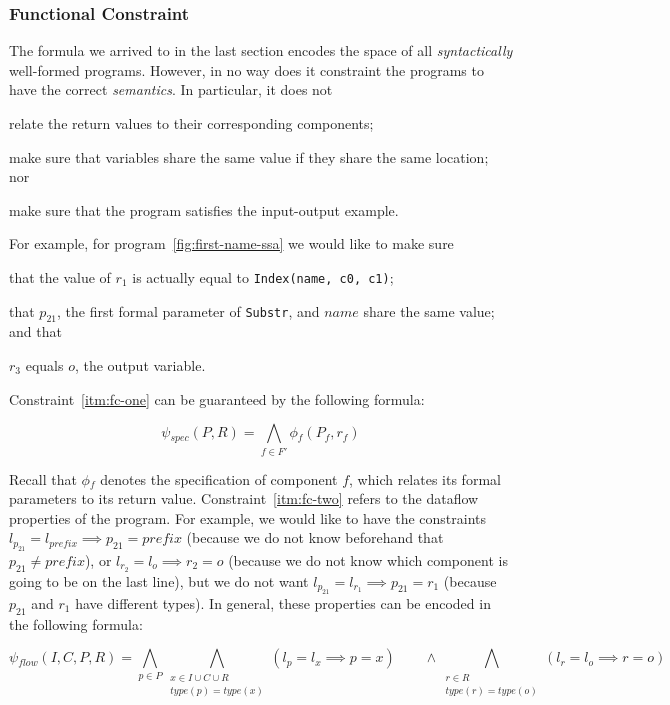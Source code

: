 \subsubsection{Functional Constraint}
\label{sec:functional-constraint}

The formula we arrived to in the last section encodes the space of all
\textit{syntactically} well-formed programs. However, in no way does it
constraint the programs to have the correct \textit{semantics}. In particular,
it does not
\begin{enumerate*}[(1)]
\item \label{itm:fc-one} relate the return values to their corresponding components;
\item \label{itm:fc-two} make sure that variables share the same value if they share the same
location; nor
\item \label{itm:fc-three} make sure that the program satisfies the input-output example.
\end{enumerate*}
For example, for program~\ref{fig:first-name-ssa} we would like to make sure
\begin{enumerate*}[(1)]
\item that the value of $r_1$ is actually equal to \lstinline{Index(name, c0, c1)};
\item that $p_{21}$, the first formal parameter of \lstinline{Substr}, and $name$
  share the same value; and that
\item $r_3$ equals $o$, the output variable.
\end{enumerate*}

Constraint~\ref{itm:fc-one} can be guaranteed by the following formula:

\[
  \psi{}_{spec}(P, R) = \bigwedge_{f \in F'} \phi{}_f (P_f, r_f)
\]

\noindent
Recall that $\phi{}_f$ denotes the specification of component $f$, which relates
its formal parameters to its return value.
Constraint~\ref{itm:fc-two} refers to
the dataflow properties of the program. For example, we would like to have the
constraints $l_{p_{21}} = l_{prefix} \implies p_{21} = prefix$ (because we do
not know beforehand that
$p_{21} \neq prefix$), or $l_{r_2} = l_o \implies r_2 = o$
(because we do not know which component is going to be on the last line), but we
do not want $l_{p_{21}} = l_{r_1} \implies p_{21} = r_1$ (because $p_{21}$ and
$r_1$ have different types). In general, these properties can be encoded in the
following formula:

\[
  \psi{}_{flow}(I, C, P, R) =
    \bigwedge_{p \in P}
    \bigwedge_{\substack{x \in I \cup C \cup R \\ type(p) = type(x)}} 
    (l_p = l_x \implies p = x)
    \qquad \wedge \bigwedge_{\substack{r \in R \\ type(r) = type(o)}}
    (l_r = l_o \implies r = o)
\]

